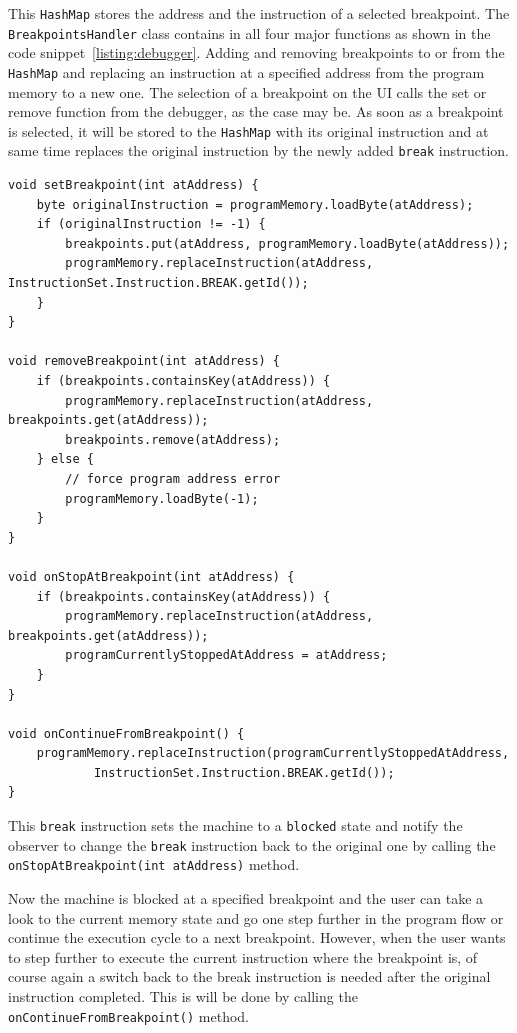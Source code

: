 This \lstinline$HashMap$ stores the address and the instruction of a selected breakpoint. The \lstinline$BreakpointsHandler$ class contains in all four major functions as shown in the code snippet~\ref{listing:debugger}. Adding and removing breakpoints to or from the \lstinline$HashMap$ and replacing an instruction at a specified address from the program memory to a new one. The selection of a breakpoint on the UI calls the set or remove function from the debugger, as the case may be. As soon as a breakpoint is selected, it will be stored to the \lstinline$HashMap$ with its original instruction and at same time replaces the original instruction by the newly added \lstinline$break$ instruction.
\begin{lstlisting}[caption={Implementation of the debugger},label=listing:debugger]
void setBreakpoint(int atAddress) {
    byte originalInstruction = programMemory.loadByte(atAddress);
    if (originalInstruction != -1) {
        breakpoints.put(atAddress, programMemory.loadByte(atAddress));
        programMemory.replaceInstruction(atAddress, InstructionSet.Instruction.BREAK.getId());
    }
}

void removeBreakpoint(int atAddress) {
    if (breakpoints.containsKey(atAddress)) {
        programMemory.replaceInstruction(atAddress, breakpoints.get(atAddress));
        breakpoints.remove(atAddress);
    } else {
        // force program address error
        programMemory.loadByte(-1);
    }
}

void onStopAtBreakpoint(int atAddress) {
    if (breakpoints.containsKey(atAddress)) {
        programMemory.replaceInstruction(atAddress, breakpoints.get(atAddress));
        programCurrentlyStoppedAtAddress = atAddress;
    }
}

void onContinueFromBreakpoint() {
    programMemory.replaceInstruction(programCurrentlyStoppedAtAddress,
    		InstructionSet.Instruction.BREAK.getId());
}
\end{lstlisting}
This \lstinline$break$ instruction sets the machine to a \lstinline$blocked$ state and notify the observer to change the \lstinline$break$ instruction back to the original one by calling the \lstinline$onStopAtBreakpoint(int atAddress)$ method. 

Now the machine is blocked at a specified breakpoint and the user can take a look to the current memory state and go one step further in the program flow or continue the execution cycle to a next breakpoint. However, when the user wants to step further to execute the current instruction where the breakpoint is, of course again a switch back to the break instruction is needed after the original instruction completed. This is will be done by calling the \lstinline$onContinueFromBreakpoint()$ method.
